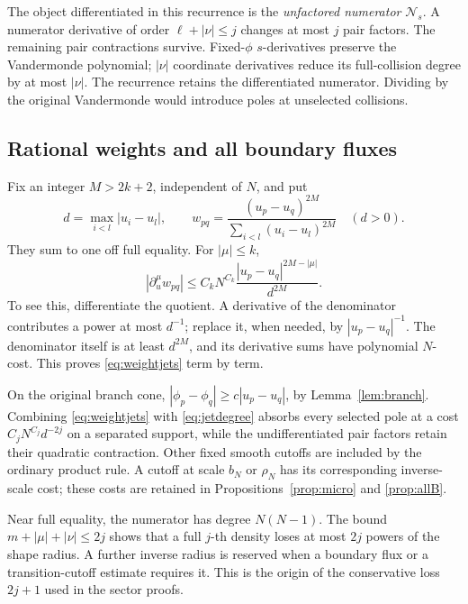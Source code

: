\documentclass[11pt]{article}
\numberwithin{equation}{section}
\theoremstyle{definition}
\begin{document}
The object differentiated in this recurrence is the
\emph{unfactored numerator} \(\mathscr N_s\).
A numerator derivative of order \(\ell+|\nu|\le j\) changes at
most \(j\) pair factors. The remaining pair contractions survive.
Fixed-\(\phi\) \(s\)-derivatives preserve the Vandermonde polynomial;
\(|\nu|\) coordinate derivatives reduce its full-collision degree
by at most \(|\nu|\).
The recurrence retains the differentiated numerator. Dividing by
the original Vandermonde would introduce poles at unselected
collisions.

\subsection{Rational weights and all boundary fluxes}
Fix an integer \(M>2k+2\), independent of \(N\), and put
\[
 d=\max_{i<l}|u_i-u_l|,\qquad
 w_{pq}=\frac{(u_p-u_q)^{2M}}
                  {\sum_{i<l}(u_i-u_l)^{2M}}\quad(d>0).
\]
They sum to one off full equality. For \(|\mu|\le k\),
\begin{equation}
 |\partial_u^\mu w_{pq}|
 \le C_kN^{C_k}
       \frac{|u_p-u_q|^{2M-|\mu|}}{d^{2M}}.
 \label{eq:weightjets}
\end{equation}
To see this, differentiate the quotient. A derivative of the
denominator contributes a power at most \(d^{-1}\); replace it,
when needed, by \(|u_p-u_q|^{-1}\). The denominator itself is
at least \(d^{2M}\), and its derivative sums have polynomial
\(N\)-cost. This proves \eqref{eq:weightjets} term by term.

On the original branch cone,
\(|\phi_p-\phi_q|\ge c|u_p-u_q|\), by
Lemma~\ref{lem:branch}. Combining \eqref{eq:weightjets} with
\eqref{eq:jetdegree} absorbs every selected pole at a cost
\(C_jN^{C_j}d^{-2j}\) on a separated support, while the
undifferentiated pair factors retain their quadratic contraction.
Other fixed smooth cutoffs are included by the ordinary product
rule. A cutoff at scale \(b_N\) or \(\rho_N\) has its corresponding
inverse-scale cost; these costs are retained in
Propositions~\ref{prop:micro} and \ref{prop:allB}.

Near full equality, the numerator has degree \(N(N-1)\).
The bound \(m+|\mu|+|\nu|\le2j\) shows that a full \(j\)-th
density loses at most \(2j\) powers of the shape radius.
A further inverse radius is reserved when a boundary flux or
a transition-cutoff estimate requires it. This is the origin
of the conservative loss \(2j+1\) used in the sector proofs.
\end{document}

